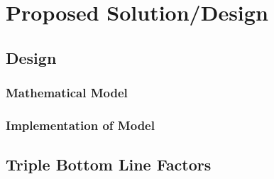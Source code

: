 \documentclass[../mthe-493-project-proposal]{subfiles}
\begin{document}
    \chapter{Proposed Solution/Design}
    \label{ch:proposed-design}
    \blindtext

    \section{Design}
    \blindtext

    \subsection{Mathematical Model}
    \blindtext

    \subsection{Implementation of Model}
    \blindtext

    \section{Triple Bottom Line Factors}
    \blindtext
\end{document}
